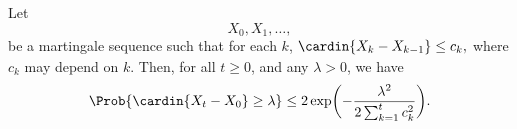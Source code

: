 \begin{theorem}
    Let 
    \begin{equation*}
        X_0, X_1, \ldots,
    \end{equation*}
    be a martingale sequence such
    that for each $k$,
    \begin{math}
        \bigl.  \cardin{X_k - X_{k-1}} \leq c_k,
    \end{math}
    where $c_k$ may depend on $k$. Then, for all $t \geq 0$, and any
    $\lambda>0$, we have
    \begin{equation*}
        \Prob{\bigl. \cardin{X_t - X_0} \geq \lambda }%
        \leq%
        2
        \exp\biggl( - \frac{\lambda^2}{2\sum_{k=1}^{t} c_k^2} \biggr).
    \end{equation*}
\end{theorem}
